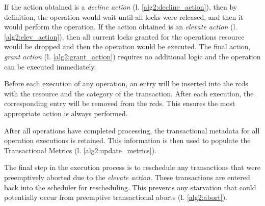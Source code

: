 If the action obtained is a \textit{decline action} (l. \ref{alg2:decline_action}), then by definition, the operation would wait until all locks were released, and then it would perform the operation. If the action obtained is an \textit{elevate action} (l. \ref{alg2:elev_action}), then all current locks granted for the operations resource would be dropped and then the operation would be executed. The final action, \textit{grant action} (l. \ref{alg2:grant_action}) requires no additional logic and the operation can be executed immediately. 


Before each execution of any operation, an entry will be inserted into the \gls{rcds} with the resource and the category of the transaction. After each execution, the corresponding entry will be removed from the \gls{rcds}. This ensures the most appropriate action is always performed.

After all operations have completed processing, the transactional metadata for all operation executions is retained. This information is then used to populate the Transactional Metrics (l. \ref{alg2:update_metrics}). 


The final step in the execution process is to reschedule any transactions that were preemptively aborted due to the \textit{elevate action}. These transactions are entered back into the scheduler for rescheduling. This prevents any starvation that could potentially occur from preemptive transactional aborts (l. \ref{alg2:abort}).
